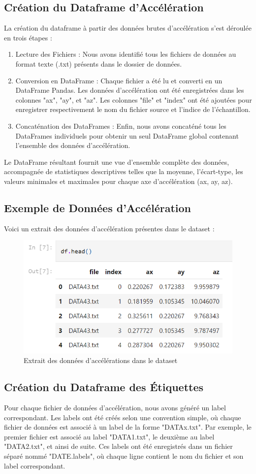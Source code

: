 \subsection{Création du Dataframe d'Accélération}
La création du dataframe à partir des données brutes d'accélération s'est déroulée en trois étapes :
\begin{enumerate}
    \item Lecture des Fichiers : Nous avons identifié tous les fichiers de données au format texte (.txt) présents dans le dossier de données.
    \item Conversion en DataFrame : Chaque fichier a été lu et converti en un DataFrame Pandas. Les données d'accélération ont été enregistrées dans les colonnes "ax", "ay", et "az". Les colonnes "file" et "index" ont été ajoutées pour enregistrer respectivement le nom du fichier source et l'indice de l'échantillon.
    \item Concaténation des DataFrames : Enfin, nous avons concaténé tous les DataFrames individuels pour obtenir un seul DataFrame global contenant l'ensemble des données d'accélération.
\end{enumerate}

Le DataFrame résultant fournit une vue d'ensemble complète des données, accompagnée de statistiques descriptives telles que la moyenne, l'écart-type, les valeurs minimales et maximales pour chaque axe d'accélération (ax, ay, az).

\subsection{Exemple de Données d'Accélération}
Voici un extrait des données d'accélération présentes dans le dataset :

\begin{figure}[h]
    \centering
    \includegraphics[width=0.4\linewidth]{img/dfhead.png}
    \caption{Extrait des données d'accélérations dans le dataset}
\end{figure}

\subsection{Création du Dataframe des Étiquettes}
Pour chaque fichier de données d'accélération, nous avons généré un label correspondant. Les labels ont été créés selon une convention simple, où chaque fichier de données est associé à un label de la forme "DATAx.txt". Par exemple, le premier fichier est associé au label "DATA1.txt", le deuxième au label "DATA2.txt", et ainsi de suite. Ces labels ont été enregistrés dans un fichier séparé nommé "DATE.labels", où chaque ligne contient le nom du fichier et son label correspondant.

